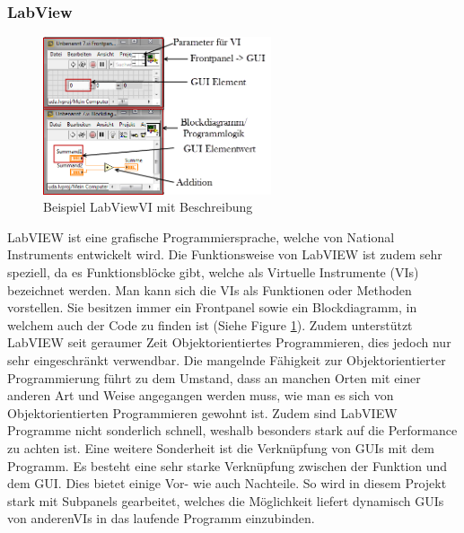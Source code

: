 \documentclass[10pt]{scrartcl}
\begin{document}
\subsubsection{LabView}
\begin{figure}
	\begin{center}
		\includegraphics[width=0.6\textwidth]{LabVIEWExample}
		\caption{Beispiel LabView\gls{VI} mit Beschreibung}
		\label{fig:LabViewExample}
	\end{center}
\end{figure}
\gls{LabVIEW} ist eine grafische Programmiersprache, welche von National Instruments entwickelt wird. Die Funktionsweise von \gls{LabVIEW} ist zudem sehr speziell, da es Funktionsblöcke gibt, welche als Virtuelle Instrumente (\gls{VI}s) bezeichnet werden. Man kann sich die \gls{VI}s als Funktionen oder Methoden vorstellen. Sie besitzen immer ein \gls{Frontpanel} sowie ein \gls{Blockdiagramm}, in welchem auch der Code zu finden ist (Siehe Figure \ref{fig:LabViewExample}). Zudem unterstützt \gls{LabVIEW} seit geraumer Zeit Objektorientiertes Programmieren, dies jedoch nur sehr eingeschränkt verwendbar.
\newline
Die mangelnde Fähigkeit zur Objektorientierter Programmierung führt zu dem Umstand, dass an manchen Orten mit einer anderen Art und Weise angegangen werden muss, wie man es sich von Objektorientierten Programmieren gewohnt ist. Zudem sind \gls{LabVIEW} Programme nicht sonderlich schnell, weshalb besonders stark auf die Performance zu achten ist.
\newline
Eine weitere Sonderheit ist die Verknüpfung von GUIs mit dem Programm. Es besteht eine sehr starke Verknüpfung zwischen der Funktion und dem GUI. Dies bietet einige Vor- wie auch Nachteile. So wird in diesem Projekt stark mit \gls{Subpanel}s gearbeitet, welches die Möglichkeit liefert dynamisch GUIs von anderen\gls{VI}s in das laufende Programm einzubinden.   
\end{document}
